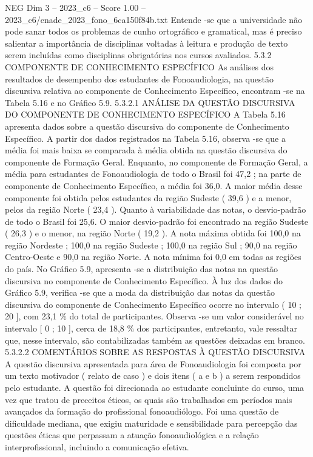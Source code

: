 \begin{textsample}{NEG Dim 3 – 2023\_c6 – Score 1.00 – 2023\_c6/enade\_2023\_fono\_6ca150f84b.txt}
Entende -se que a universidade não pode sanar todos os problemas de cunho ortográfico e gramatical, mas é preciso salientar a importância de disciplinas voltadas à leitura e produção de texto serem incluídas como disciplinas obrigatórias nos cursos avaliados. 5.3.2 COMPONENTE DE CONHECIMENTO ESPECÍFICO As análises dos resultados de desempenho dos estudantes de Fonoaudiologia, na questão discursiva relativa ao componente de Conhecimento Específico, encontram -se na Tabela 5.16 e no Gráfico 5.9. 5.3.2.1 ANÁLISE DA QUESTÃO DISCURSIVA DO COMPONENTE DE CONHECIMENTO ESPECÍFICO A Tabela 5.16 apresenta dados sobre a questão discursiva do componente de Conhecimento Específico.
A partir dos dados registrados na Tabela 5.16, observa -se que a média foi mais baixa se comparada à média obtida na questão discursiva do componente de Formação Geral.
Enquanto, no componente de Formação Geral, a média para estudantes de Fonoaudiologia de todo o Brasil foi 47,2 ; na parte de componente de Conhecimento Específico, a média foi 36,0.
A maior média desse componente foi obtida pelos estudantes da região Sudeste ( 39,6 ) e a menor, pelos da região Norte ( 23,4 ).
Quanto à variabilidade das notas, o desvio-padrão de todo o Brasil foi 25,6.
O maior desvio-padrão foi encontrado na região Sudeste ( 26,3 ) e o menor, na região Norte ( 19,2 ).
A nota máxima obtida foi 100,0 na região Nordeste ; 100,0 na região Sudeste ; 100,0 na região Sul ; 90,0 na região Centro-Oeste e 90,0 na região Norte.
A nota mínima foi 0,0 em todas as regiões do país.
No Gráfico 5.9, apresenta -se a distribuição das notas na questão discursiva no componente de Conhecimento Específico.
À luz dos dados do Gráfico 5.9, verifica -se que a moda da distribuição das notas da questão discursiva do componente de Conhecimento Específico ocorre no intervalo ( 10 ; 20 ], com 23,1 \% do total de participantes.
Observa -se um valor considerável no intervalo [ 0 ; 10 ], cerca de 18,8 \% dos participantes, entretanto, vale ressaltar que, nesse intervalo, são contabilizadas também as questões deixadas em branco. 5.3.2.2 COMENTÁRIOS SOBRE AS RESPOSTAS À QUESTÃO DISCURSIVA A questão discursiva apresentada para área de Fonoaudiologia foi composta por um texto motivador ( relato de caso ) e dois itens ( a e b ) a serem respondidos pelo estudante.
A questão foi direcionada ao estudante concluinte do curso, uma vez que tratou de preceitos éticos, os quais são trabalhados em períodos mais avançados da formação do profissional fonoaudiólogo.
Foi uma questão de dificuldade mediana, que exigiu maturidade e sensibilidade para percepção das questões éticas que perpassam a atuação fonoaudiológica e a relação interprofissional, incluindo a comunicação efetiva.

\end{textsample}
